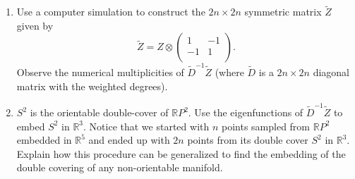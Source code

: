 \begin{myexercise}
\begin{enumerate}
\item Use a computer simulation to construct the $2n \times 2n$ symmetric matrix $\tilde{Z}$ given by $$\tilde{Z} = Z \otimes \left(
                                                                               \begin{array}{rr}
                                                                                 1 & -1 \\
                                                                                 -1 & 1 \\
                                                                               \end{array}
                                                                             \right).$$
Observe the numerical multiplicities of $\tilde{D}^{-1}\tilde{Z}$ (where $\tilde{D}$ is a $2n\times 2n$ diagonal matrix with the weighted degrees).

\item $S^2$ is the orientable double-cover of $\mathbb{R}P^2$. Use the eigenfunctions of $\tilde{D}^{-1}\tilde{Z}$ to embed $S^2$ in $\mathbb{R}^3$. Notice that we started with $n$ points sampled from $\mathbb{R}P^2$ embedded in $\mathbb{R}^5$ and ended up with $2n$ points from its double cover $S^2$ in $\mathbb{R}^3$. Explain how this procedure can be generalized to find the embedding of the double covering of any non-orientable manifold.

\end{enumerate}

\end{myexercise}


